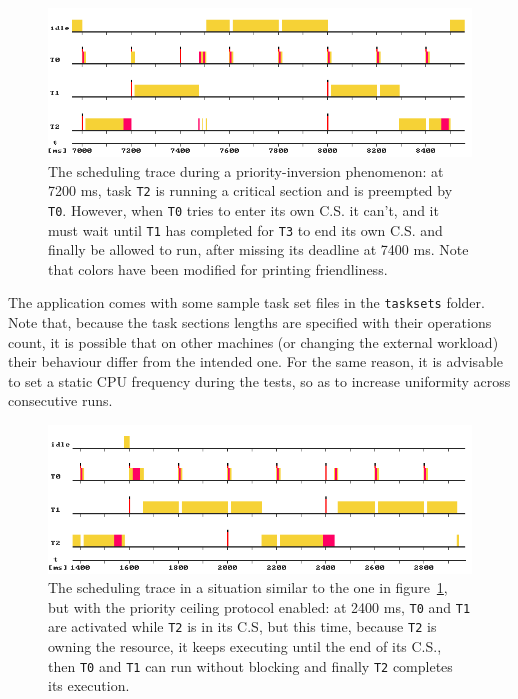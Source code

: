 \documentclass[paper=a4, fontsize=11pt]{scrartcl}
\newcommand{\mono}[1]{\texttt{#1}}
\numberwithin{equation}{section}        %
\numberwithin{figure}{section}          %
\numberwithin{table}{section}               %
\numberwithin{fragment}{section}
\begin{document}
\begin{figure}
  \centering
  \includegraphics[width=1\textwidth]{img/inversion.png}
  \caption{\label{fig:inversion} The scheduling trace during a priority-inversion phenomenon: at 7200 ms, task \mono{T2} is running a critical section and is preempted by \mono{T0}. However, when \mono{T0} tries to enter its own C.S. it can't, and it must wait until \mono{T1} has completed for \mono{T3} to end its own C.S. and finally be allowed to run, after missing its deadline at 7400 ms. Note that colors have been modified for printing friendliness.}
\end{figure}

The application comes with some sample task set files in the \mono{tasksets} folder. Note that, because the task sections lengths are specified with their operations count, it is possible that on other machines (or changing the external workload) their behaviour differ from the intended one. For the same reason, it is advisable to set a static CPU frequency during the tests, so as to increase uniformity across consecutive runs.

\begin{figure}
  \centering
  \includegraphics[width=1\textwidth]{img/noinversion_ceiling.png}
  \caption{\label{fig:noinversion-ceiling} The scheduling trace in a situation similar to the one in figure~\ref{fig:inversion}, but with the priority ceiling protocol enabled: at 2400 ms, \mono{T0} and \mono{T1} are activated while \mono{T2} is in its C.S, but this time, because \mono{T2} is owning the resource, it keeps executing until the end of its C.S., then \mono{T0} and \mono{T1} can run without blocking and finally \mono{T2} completes its execution.}
\end{figure}
\end{document}
